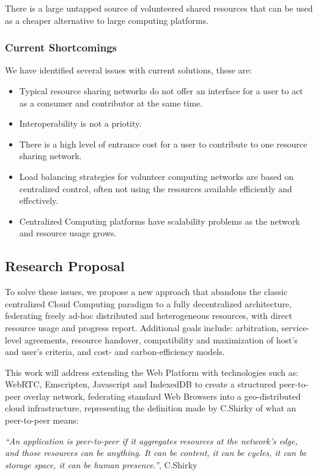 There is a large untapped source of volunteered shared resources that can be used as a cheaper alternative to large computing platforms.

\subsubsection{Current Shortcomings}

We have identified several issues with current solutions, these are:

\begin{itemize}
    \item Typical resource sharing networks do not offer an interface for a user to act as a consumer and contributor at the same time.
    \item Interoperability is not a priotity.
    \item There is a high level of entrance cost for a user to contribute to one resource sharing network.
    \item Load balancing strategies for volunteer computing networks are based on centralized control,  often not using the resources available efficiently and effectively.
    \item Centralized Computing platforms have scalability problems as the network and resource usage grows.
\end{itemize}

\subsection{Research Proposal}

To solve these issues, we propose a new approach that abandons the classic centralized Cloud Computing paradigm to a fully decentralized architecture, federating freely ad-hoc distributed and heterogeneous resources, with direct resource usage and progress report. Additional goals include: arbitration, service-level agreements, resource handover, compatibility and maximization of host's and user's criteria, and cost- and carbon-efficiency models.

This work will address extending the Web Platform with technologies such as: WebRTC, Emscripten, Javascript and IndexedDB to create a structured peer-to-peer overlay network, federating standard Web Browsers into a geo-distributed cloud infrastructure, representing the definition made by C.Shirky of what an peer-to-peer means:

  \textit{``An application is peer-to-peer if it aggregates resources at the network’s edge, and those resources can be anything. It can be content, it can be cycles, it can be storage space, it can be human presence.''}, C.Shirky \cite{Shirky.}

